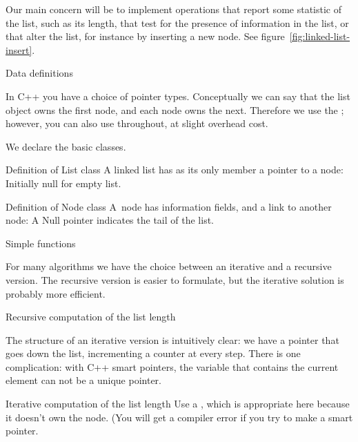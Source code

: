 Our main concern will be to implement operations that report some
statistic of the list, such as its length, that test for the presence
of information in the list, or that alter the list, for
instance by inserting a new node. See figure~\ref{fig:linked-list-insert}.

 {Data definitions}

In C++ you have a choice of pointer types. Conceptually we can say
that the list object owns the first node, and each node owns the
next. Therefore we use the ; however, you can
also use  throughout, at slight overhead cost.

We declare the basic classes.

\begin{block}{Definition of List class}
  \label{sl:list-class}
  A linked list has as its only member a pointer to a node:
  Initially null for empty list.
\end{block}

\begin{block}{Definition of Node class}
  \label{sl:node-class}
  A~node has information fields, and a
  link to another node:
  A Null pointer indicates the tail of the list.
\end{block}

 {Simple functions}

For many algorithms we have the choice between an iterative and a
recursive version. The recursive version is easier to formulate, but
the iterative solution is probably more efficient.

\begin{block}{Recursive computation of the list length}
  \label{sl:linkedlist-length-recur}
\end{block}

The structure of an iterative version is intuitively clear: we have a
pointer that goes down the list, incrementing a counter at every
step. There is one complication: 
with C++ smart pointers, the variable that contains the current
element can not be a unique pointer.

\begin{block}{Iterative computation of the list length}
  \label{sl:linkedlist-length-iter}
  Use a
  , which is appropriate here because it doesn't
  own the node.
  (You will get a compiler error if you try to make  a
  smart pointer.
\end{block}

